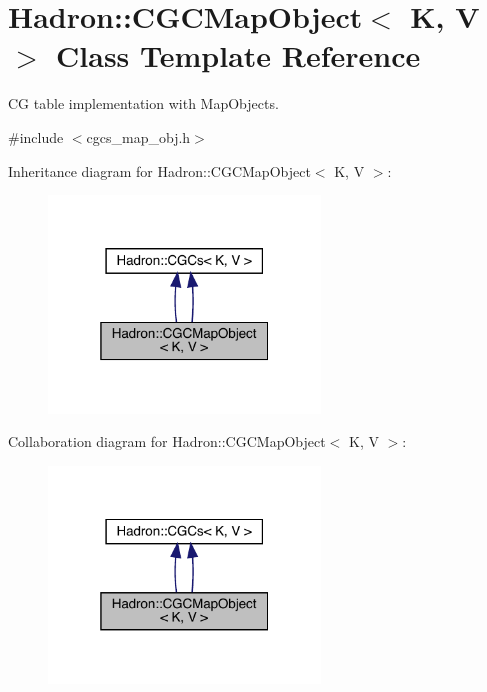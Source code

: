 \hypertarget{classHadron_1_1CGCMapObject}{}\section{Hadron\+:\+:C\+G\+C\+Map\+Object$<$ K, V $>$ Class Template Reference}
\label{classHadron_1_1CGCMapObject}


CG table implementation with Map\+Objects.  




{\ttfamily \#include $<$cgcs\+\_\+map\+\_\+obj.\+h$>$}



Inheritance diagram for Hadron\+:\+:C\+G\+C\+Map\+Object$<$ K, V $>$\+:\nopagebreak
\begin{figure}[H]
\begin{center}
\leavevmode
\includegraphics[width=205pt]{d6/d01/classHadron_1_1CGCMapObject__inherit__graph}
\end{center}
\end{figure}


Collaboration diagram for Hadron\+:\+:C\+G\+C\+Map\+Object$<$ K, V $>$\+:\nopagebreak
\begin{figure}[H]
\begin{center}
\leavevmode
\includegraphics[width=205pt]{d9/dd5/classHadron_1_1CGCMapObject__coll__graph}
\end{center}
\end{figure}
